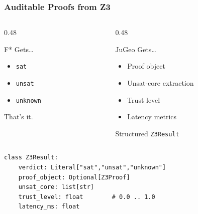 \begin{frame}[fragile]
\frametitle{Auditable Proofs from Z3}
\begin{columns}[T]
\begin{column}{0.48\textwidth}
\begin{alertblock}{F* Gets\ldots}
  \begin{itemize}
    \item \texttt{sat}
    \item \texttt{unsat}
    \item \texttt{unknown}
  \end{itemize}
  \centering\small\textcolor{jugeoRed}{That's it.}
\end{alertblock}
\end{column}
\begin{column}{0.48\textwidth}
\begin{exampleblock}{JuGeo Gets\ldots}
  \begin{itemize}
    \item Proof object
    \item Unsat-core extraction
    \item Trust level
    \item Latency metrics
  \end{itemize}
  \centering\small\textcolor{jugeoGreen}{Structured \texttt{Z3Result}}
\end{exampleblock}
\end{column}
\end{columns}
\vfill
\begin{lstlisting}
class Z3Result:
    verdict: Literal["sat","unsat","unknown"]
    proof_object: Optional[Z3Proof]
    unsat_core: list[str]
    trust_level: float        # 0.0 .. 1.0
    latency_ms: float
\end{lstlisting}
\end{frame}


